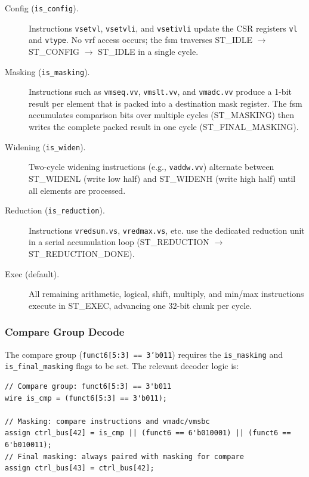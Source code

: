 \begin{description}
  \item[Config (\texttt{is\_config}).] Instructions \texttt{vsetvl}, \texttt{vsetvli},
    and \texttt{vsetivli} update the CSR registers \texttt{vl} and \texttt{vtype}.
    No \gls{vrf} access occurs; the \gls{fsm} traverses ST\_IDLE $\to$ ST\_CONFIG $\to$
    ST\_IDLE in a single cycle.
  \item[Masking (\texttt{is\_masking}).] Instructions such as \texttt{vmseq.vv},
    \texttt{vmslt.vv}, and \texttt{vmadc.vv} produce a 1-bit result per element that
    is packed into a destination mask register. The \gls{fsm} accumulates comparison
    bits over multiple cycles (ST\_MASKING) then writes the complete packed result in
    one cycle (ST\_FINAL\_MASKING).
  \item[Widening (\texttt{is\_widen}).] Two-cycle widening instructions (e.g.,
    \texttt{vaddw.vv}) alternate between ST\_WIDENL (write low half) and ST\_WIDENH
    (write high half) until all elements are processed.
  \item[Reduction (\texttt{is\_reduction}).] Instructions \texttt{vredsum.vs},
    \texttt{vredmax.vs}, etc. use the dedicated reduction unit in a serial
    accumulation loop (ST\_REDUCTION $\to$ ST\_REDUCTION\_DONE).
  \item[Exec (default).] All remaining arithmetic, logical, shift, multiply, and
    min/max instructions execute in ST\_EXEC, advancing one 32-bit chunk per cycle.
\end{description}

\subsubsection{Compare Group Decode}

The compare group (\texttt{funct6[5:3] == 3'b011}) requires the \texttt{is\_masking}
and \texttt{is\_final\_masking} flags to be set. The relevant decoder logic is:

\begin{lstlisting}[language=SV,
  caption={Compare group detection in \texttt{vproc\_vdecoder} (representative extract)},
  label={lst:cmp_decode}]
// Compare group: funct6[5:3] == 3'b011
wire is_cmp = (funct6[5:3] == 3'b011);

// Masking: compare instructions and vmadc/vmsbc
assign ctrl_bus[42] = is_cmp || (funct6 == 6'b010001) || (funct6 == 6'b010011);
// Final masking: always paired with masking for compare
assign ctrl_bus[43] = ctrl_bus[42];
\end{lstlisting}

